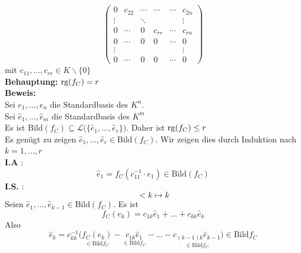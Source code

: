 \begin{enumerate}[(i)]
\[\begin{pmatrix}
			0 & c_{22} & \cdots & \cdots & \cdots & c_{2n} \\
			\vdots & & \ddots & & & \vdots \\
			0 & \cdots & 0 & c_{rr} & \cdots & c_{rn} \\
			0 & \cdots & 0 & 0 & \cdots & 0 \\
			\vdots & & & & & \vdots \\
			0 & \cdots & 0 & 0 & \cdots & 0
		\end{pmatrix}
	\]
	mit $c_{11}, \ldots , c_{rr} \in K \backslash \{0\}$ 
	\vspace{\baselineskip} \\
	\textbf{Behauptung:} $\operatorname{rg} (f_C) = r$ \\
	\textbf{Beweis:}\\
	Sei $e_1, \ldots , e_n$ die Standardbasis des $K^n$. \\
	Sei $\hat e_1 , \ldots , \hat e_m$ die Standardbasis des $K^m$
	\vspace{\baselineskip} \\
	Es ist Bild$(f_C) \subseteq \mathcal{L} \big( \{ \hat e_1 , \ldots , \hat e_r \}\big)$. Daher ist $\operatorname{rg} (f_C) \leq r$ \\
	Es genügt zu zeigen $ \hat e_1 , \ldots , \hat e_r \in \text{Bild} (f_C)$. 
	Wir zeigen dies durch Induktion nach $k=1, \ldots , r$
	\vspace{\baselineskip} \\
	\textbf{I.A} :
	\[
		\hat e_1 = f_C (c_{11}^{-1} \cdot e_1) \in \text{Bild} (f_C)
	\]
	\textbf{I.S.} :
	\[
		< k \mapsto k
	\]
	Seien $\hat e_1 , \ldots , \hat e_{k-1} \in \text{Bild} (f_C)$. Es ist
	\[
		f_C (e_k) = c_{1k} \hat e_1 + \ldots + c_{kk} \hat e_{k}
	\]
	Also
	\[
		\hat e_k = c_{kk}^{-1} \Big( \underset{\in \text{Bild} f_C}{f_C (e_k)} - 
		\underset{\in \text{Bild} f_C}{c_{1k} \hat e_1} - \ldots - 
		\underset{\in \text{Bild} f_C}{c_{(k-1) k} \hat e_{k-1}} \Big) \in \text{Bild} f_C
	\]
\end{enumerate}

